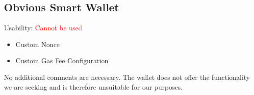 \documentclass[fleqn,10pt]{olplainarticle}
\newcommand{\xmark}{\ding{55}}%
\begin{document}
\subsection{Obvious Smart Wallet}
Usability: \textcolor{red}{Cannot be used}
\begin{itemize}[noitemsep, nolistsep]
	\item [\textcolor{red}{\xmark}] Custom Nonce
	\item [\textcolor{red}{\xmark}] Custom Gas Fee Configuration
\end{itemize}
No additional comments are necessary. The wallet does not offer the functionality we are seeking and is therefore unsuitable for our purposes.


\newpage

\end{document}
